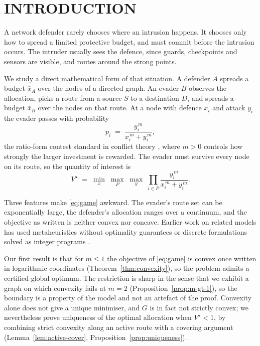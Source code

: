\documentclass[10pt,a4paper,twoside]{article}
\theoremstyle{plain}
\theoremstyle{definition}
\newcommand{\XA}{\bar{x}_A}
\newcommand{\XB}{\bar{x}_B}
\begin{document}
\section{INTRODUCTION}
\label{sec:intro}

A network defender rarely chooses where an intrusion happens. It chooses only
how to spread a limited protective budget, and must commit before the
intrusion occurs. The intruder usually sees the defence, since guards,
checkpoints and sensors are visible, and routes around the strong points.

We study a direct mathematical form of that situation. A defender $A$ spreads
a budget $\XA$ over the nodes of a directed graph. An evader $B$ observes the
allocation, picks a route from a source $S$ to a destination $D$, and spreads
a budget $\XB$ over the nodes on that route. At a node with defence $x_i$ and
attack $y_i$ the evader passes with probability
\begin{equation}
  p_i \;=\; \frac{y_i^{\,m}}{x_i^{\,m}+y_i^{\,m}},
  \label{eq:csf}
\end{equation}
the ratio-form contest standard in conflict theory
\citep{tullock1980,skaperdas1996}, where $m>0$ controls how strongly the
larger investment is rewarded. The evader must survive every node on its
route, so the quantity of interest is
\begin{equation}
  V^{\star}
  \;=\;
  \min_{x}\;\max_{P}\;\max_{y}\;
  \prod_{i\in P}\frac{y_i^{\,m}}{x_i^{\,m}+y_i^{\,m}}.
  \label{eq:game}
\end{equation}

Three features make \eqref{eq:game} awkward. The evader's route set can be
exponentially large, the defender's allocation ranges over a continuum, and
the objective as written is neither convex nor concave. Earlier work on
related models has used metaheuristics without optimality guarantees
\citep{ramirez2011} or discrete formulations solved as integer programs
\citep{nguyen2023}.

Our first result is that for $m\le1$ the objective of \eqref{eq:game} is
convex once written in logarithmic coordinates (Theorem~\ref{thm:convexity}),
so the problem admits a certified global optimum. The restriction is sharp in
the sense that we exhibit a graph on which convexity fails at $m=2$
(Proposition~\ref{prop:m-gt-1}), so the boundary is a property of the model
and not an artefact of the proof. Convexity alone does not give a unique
minimiser, and $G$ is in fact not strictly convex; we nevertheless prove
uniqueness of the optimal allocation when $V^{\star}<1$, by combining strict
convexity along an active route with a covering argument
(Lemma~\ref{lem:active-cover}, Proposition~\ref{prop:uniqueness}).
\end{document}
